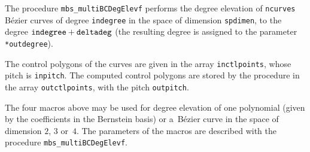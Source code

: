 \begin{sloppypar}
\hspace*{\parindent}The procedure \texttt{mbs\_multiBCDegElevf} performs
the degree elevation of \texttt{ncurves} B\'{e}zier curves of degree
\texttt{indegree} in the space of dimension \texttt{spdimen}, to the degree
$\mathord{\mbox{\texttt{indegree}}}+\mathord{\mbox{\texttt{deltadeg}}}$
(the resulting degree is assigned to the parameter \texttt{*outdegree}).

The control polygons of the curves are given in the array \texttt{inctlpoints},
whose pitch is \texttt{inpitch}. The computed control polygons are stored
by the procedure in the array \texttt{outctlpoints}, with the pitch
\texttt{outpitch}.
\end{sloppypar}

\vspace{\bigskipamount}
\begin{sloppypar}
The four macros above may be used for degree elevation of one polynomial
(given by the coefficients in the Bernstein basis) or a~B\'{e}zier curve
in the space of dimension $2$, $3$ or~$4$. The parameters of the macros
are described with the procedure \texttt{mbs\_multiBCDegElevf}.
\end{sloppypar}

